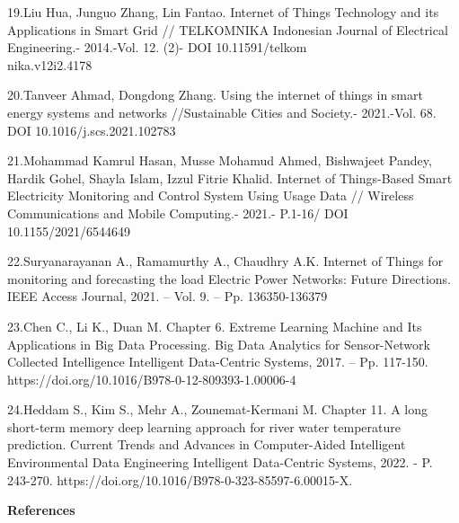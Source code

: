 \begin{noparindent}
19.Liu Hua, Junguo Zhang, Lin Fantao. Internet of Things Technology and
its Applications in Smart Grid // TELKOMNIKA Indonesian Journal of
Electrical Engineering.- 2014.-Vol. 12. (2)- DOI
10.11591/telkom\\nika.v12i2.4178

20.Tanveer Ahmad, Dongdong Zhang. Using the internet of things in smart
energy systems and networks //Sustainable Cities and Society.-
2021.-Vol. 68. DOI 10.1016/j.scs.2021.102783

21.Mohammad Kamrul Hasan, Musse Mohamud Ahmed, Bishwajeet Pandey, Hardik
Gohel, Shayla Islam, Izzul Fitrie Khalid. Internet of Things-Based Smart
Electricity Monitoring and Control System Using Usage Data // Wireless
Communications and Mobile Computing.- 2021.- P.1-16/ DOI 10.1155/2021/6544649

22.Suryanarayanan A., Ramamurthy A., Chaudhry A.K. Internet of Things
for monitoring and forecasting the load Electric Power Networks: Future
Directions. IEEE Access Journal, 2021. -- Vol. 9. -- Pp. 136350-136379

23.Chen C., Li K., Duan M. Chapter 6. Extreme Learning Machine and Its
Applications in Big Data Processing. Big Data Analytics for
Sensor-Network Collected Intelligence Intelligent Data-Centric Systems,
2017. -- Pp. 117-150. https://doi.org/10.1016/B978-0-12-809393-1.00006-4

24.Heddam S., Kim S., Mehr A., Zounemat-Kermani M. Chapter 11. A long
short-term memory deep learning approach for river water temperature
prediction. Current Trends and Advances in Computer-Aided Intelligent
Environmental Data Engineering Intelligent Data-Centric Systems, 2022. -
P. 243-270. https://doi.org/10.1016/B978-0-323-85597-6.00015-X.

\end{noparindent}

\begin{center}
  {\bfseries References}
  \end{center}


